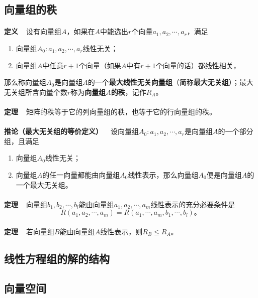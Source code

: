 \subsection{向量组的秩}
\paragraph{}
\textbf{定义~~}设有向量组$A$，如果在$A$中能选出$r$个向量$a_1,a_2,\cdots,a_r$，满足
\begin{enumerate}
  \item 向量组$A_0:a_1,a_2,\cdots,a_r$线性无关；
  \item 向量组$A$中任意$r+1$个向量（如果$A$中有$r+1$个向量的话）都线性相关，
\end{enumerate}
那么称向量组$A_0$是向量组$A$的一个\textbf{最大线性无关向量组}（简称\textbf{最大无关组}）；最大无关组所含向量个数$r$称为\textbf{向量组$A$的秩}，记作$R_A$。

\paragraph{}
\textbf{定理~~}矩阵的秩等于它的列向量组的秩，也等于它的行向量组的秩。

\paragraph{}
\textbf{推论（最大无关组的等价定义）~~}设向量组$A_0:a_1,a_2,\cdots,a_r$是向量组$A$的一个部分组，且满足
\begin{enumerate}
  \item 向量组$A_0$线性无关；
  \item 向量组$A$的任一向量都能由向量组$A_0$线性表示，那么向量组$A_0$便是向量组$A$的一个最大无关组。
\end{enumerate}

\paragraph{}
\textbf{定理~~}向量组$b_1,b_2,\cdots,b_l$能由向量组$a_1,a_2,\cdots,a_m$线性表示的充分必要条件是
\begin{equation*}
  R(a_1,a_2,\cdots,a_m) = R(a_1,\cdots,a_m,b_1,\cdots,b_l)。
\end{equation*}

\paragraph{}
\textbf{定理~~}若向量组$B$能由向量组$A$线性表示，则$R_B \leq R_A$。

\subsection{线性方程组的解的结构}
\paragraph{}

\subsection{向量空间}
\paragraph{}
